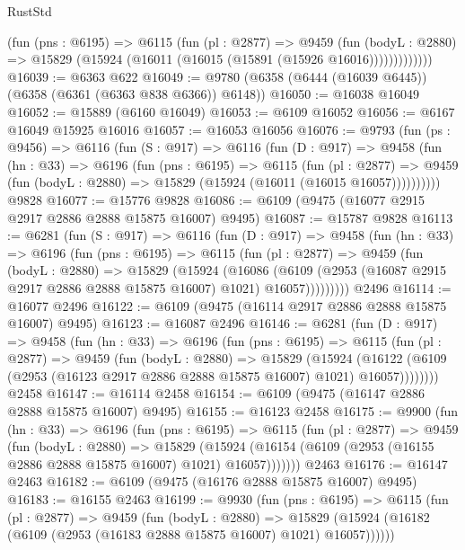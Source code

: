 \begin{lexlean}{RustStd}
\begin{coremodule}
              (fun (pns : @6195) =>
              @6115
                (fun (pl : @2877) =>
                @9459
                  (fun (bodyL : @2880) =>
                  @15829 (@15924 (@16011 (@16015 (@15891 (@15926 @16016)))))))))))))
@16039 := @6363 @622
@16049 := @9780 (@6358 (@6444 (@16039 @6445)) (@6358 (@6361 (@6363 @838 @6366)) @6148))
@16050 := @16038 @16049
@16052 := @15889 (@6160 @16049)
@16053 := @6109 @16052
@16056 := @6167 @16049 @15925 @16016
@16057 := @16053 @16056
@16076 := @9793
    (fun (ps : @9456) =>
    @6116
      (fun (S : @917) =>
      @6116
        (fun (D : @917) =>
        @9458
          (fun (hn : @33) =>
          @6196
            (fun (pns : @6195) =>
            @6115
              (fun (pl : @2877) =>
              @9459 (fun (bodyL : @2880) => @15829 (@15924 (@16011 (@16015 @16057))))))))))
    @9828
@16077 := @15776 @9828
@16086 := @6109 (@9475 (@16077 @2915 @2917 @2886 @2888 @15875 @16007) @9495)
@16087 := @15787 @9828
@16113 := @6281
    (fun (S : @917) =>
    @6116
      (fun (D : @917) =>
      @9458
        (fun (hn : @33) =>
        @6196
          (fun (pns : @6195) =>
          @6115
            (fun (pl : @2877) =>
            @9459
              (fun (bodyL : @2880) =>
              @15829
                (@15924
                  (@16086
                    (@6109
                      (@2953 (@16087 @2915 @2917 @2886 @2888 @15875 @16007) @1021)
                      @16057)))))))))
    @2496
@16114 := @16077 @2496
@16122 := @6109 (@9475 (@16114 @2917 @2886 @2888 @15875 @16007) @9495)
@16123 := @16087 @2496
@16146 := @6281
    (fun (D : @917) =>
    @9458
      (fun (hn : @33) =>
      @6196
        (fun (pns : @6195) =>
        @6115
          (fun (pl : @2877) =>
          @9459
            (fun (bodyL : @2880) =>
            @15829
              (@15924
                (@16122 (@6109 (@2953 (@16123 @2917 @2886 @2888 @15875 @16007) @1021) @16057))))))))
    @2458
@16147 := @16114 @2458
@16154 := @6109 (@9475 (@16147 @2886 @2888 @15875 @16007) @9495)
@16155 := @16123 @2458
@16175 := @9900
    (fun (hn : @33) =>
    @6196
      (fun (pns : @6195) =>
      @6115
        (fun (pl : @2877) =>
        @9459
          (fun (bodyL : @2880) =>
          @15829
            (@15924 (@16154 (@6109 (@2953 (@16155 @2886 @2888 @15875 @16007) @1021) @16057)))))))
    @2463
@16176 := @16147 @2463
@16182 := @6109 (@9475 (@16176 @2888 @15875 @16007) @9495)
@16183 := @16155 @2463
@16199 := @9930
    (fun (pns : @6195) =>
    @6115
      (fun (pl : @2877) =>
      @9459
        (fun (bodyL : @2880) =>
        @15829 (@15924 (@16182 (@6109 (@2953 (@16183 @2888 @15875 @16007) @1021) @16057))))))

\end{coremodule}
\end{lexlean}
